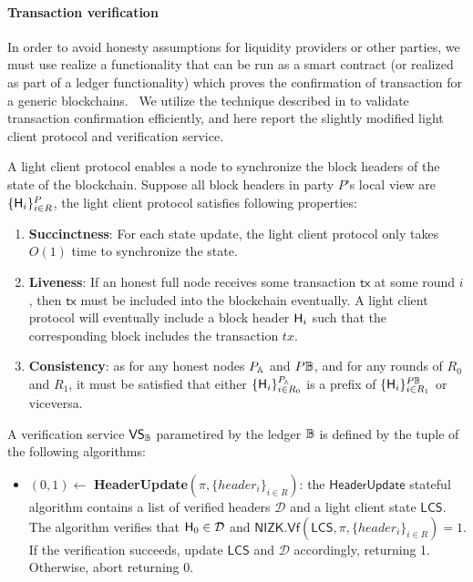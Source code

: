 \paragraph*{Transaction verification}
In order to avoid honesty assumptions for liquidity providers or other parties, we must use realize a functionality that can be run as a smart contract (or realized as part of a ledger functionality) which proves the confirmation of transaction for a generic blockchains. \
We utilize the technique described in \cite{zkbridge} to validate transaction confirmation efficiently, and here report the slightly modified light client protocol and verification service.
\vspace{0.5em}
\begin{definition}
A light client protocol enables a node to synchronize the block headers of the state of the
blockchain. Suppose all block headers in party $P$’s local view are $\{ \mathsf{H}_i \}^P_{i \in R}$, 
the light client protocol satisfies following properties:
\begin{enumerate}
	\item \textbf{Succinctness}: For each state update, the light client protocol only takes $O(1)$ time to synchronize the state.
	\item \textbf{Liveness}: If an honest full node receives some transaction $\mathsf{tx}$ at some round $i$, then $\mathsf{tx}$ must be included into the blockchain eventually. A light client protocol will eventually include a block header $\mathsf{H}_i$ such that the corresponding block includes the transaction $tx$.
        \item \textbf{Consistency}: as for any honest nodes $P_{\mathbb{A}}$ and $P{\mathbb{B}}$, and for any rounds of $R_0$ and $R_1$, it must be satisfied that either $\{ \mathsf{H}_i \}^{P_{\mathbb{A}}}_{i \in R_0}$ is a prefix of $\{ \mathsf{H}_i \}^{P{\mathbb{B}}}_{i \in R_1}$ or viceversa.
\end{enumerate}
\end{definition}
\vspace{0.5em}

\begin{definition}
A verification service $\mathsf{VS}_{\mathbb{B}}$ parametired by the ledger $\mathbb{B}$ is defined by the tuple of the following algorithms:
\begin{itemize}[topsep=0pt, itemsep=0pt, leftmargin=2em]
    \item $(0,1) \gets$ \textbf{HeaderUpdate}$(\pi, \{ header_i \}_{i \in R})$: the $\mathsf{HeaderUpdate}$ stateful algorithm contains a list of verified headers $\mathcal{D}$ and a light client state $\mathsf{LCS}$. \\ The algorithm verifies that $\mathsf{H}_0 \in \mathcal{D}$ and $\mathsf{NIZK}.\mathsf{Vf}(\mathsf{LCS}, \pi, \{ header_i \}_{i \in R}) = 1$. If the verification succeeds, update $\mathsf{LCS}$ and $\mathcal{D}$ accordingly, returning 1. Otherwise, abort returning 0.
\end{itemize}
\end{definition}

